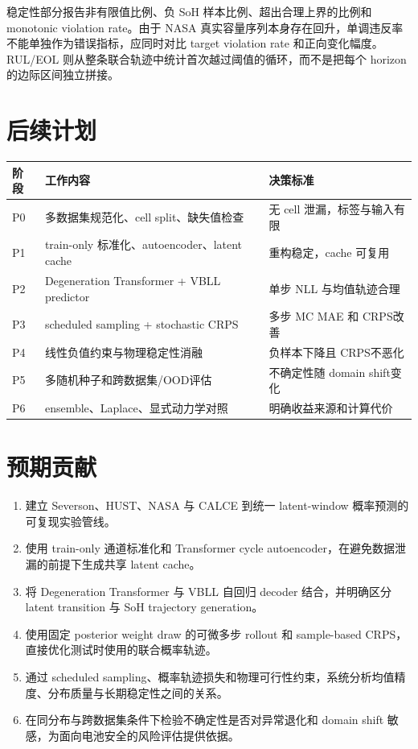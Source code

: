 \documentclass[11pt,a4paper,fontset=none]{ctexart}
\begin{document}
稳定性部分报告非有限值比例、负 SoH 样本比例、超出合理上界的比例和 monotonic violation rate。由于 NASA 真实容量序列本身存在回升，单调违反率不能单独作为错误指标，应同时对比 target violation rate 和正向变化幅度。RUL/EOL 则从整条联合轨迹中统计首次越过阈值的循环，而不是把每个 horizon 的边际区间独立拼接。

\section{后续计划}

\begin{table}[h]
\centering
\small
\begin{tabular}{lll}
\toprule
阶段 & 工作内容 & 决策标准 \\
\midrule
P0 & 多数据集规范化、cell split、缺失值检查 & 无 cell 泄漏，标签与输入有限 \\
P1 & train-only 标准化、autoencoder、latent cache & 重构稳定，cache 可复用 \\
P2 & Degeneration Transformer + VBLL predictor & 单步 NLL 与均值轨迹合理 \\
P3 & scheduled sampling + stochastic CRPS & 多步 MC MAE 和 CRPS改善 \\
P4 & 线性负值约束与物理稳定性消融 & 负样本下降且 CRPS不恶化 \\
P5 & 多随机种子和跨数据集/OOD评估 & 不确定性随 domain shift变化 \\
P6 & ensemble、Laplace、显式动力学对照 & 明确收益来源和计算代价 \\
\bottomrule
\end{tabular}
\end{table}

\section{预期贡献}

\begin{enumerate}
  \item 建立 Severson、HUST、NASA 与 CALCE 到统一 latent-window 概率预测的可复现实验管线。
  \item 使用 train-only 通道标准化和 Transformer cycle autoencoder，在避免数据泄漏的前提下生成共享 latent cache。
  \item 将 Degeneration Transformer 与 VBLL 自回归 decoder 结合，并明确区分 latent transition 与 SoH trajectory generation。
  \item 使用固定 posterior weight draw 的可微多步 rollout 和 sample-based CRPS，直接优化测试时使用的联合概率轨迹。
  \item 通过 scheduled sampling、概率轨迹损失和物理可行性约束，系统分析均值精度、分布质量与长期稳定性之间的关系。
  \item 在同分布与跨数据集条件下检验不确定性是否对异常退化和 domain shift 敏感，为面向电池安全的风险评估提供依据。
\end{enumerate}
\end{document}
